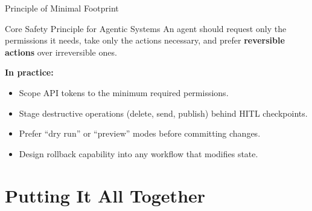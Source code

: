 \documentclass{beamer}       %
\begin{document}
\begin{frame}{Principle of Minimal Footprint}
    \begin{block}{Core Safety Principle for Agentic Systems}
        An agent should request only the permissions it needs, take only the actions necessary, and prefer \textbf{reversible actions} over irreversible ones.
    \end{block}
    \vspace{0.2cm}
    \textbf{In practice:}
    \begin{itemize}
        \item Scope API tokens to the minimum required permissions.
        \item Stage destructive operations (delete, send, publish) behind HITL checkpoints.
        \item Prefer ``dry run'' or ``preview'' modes before committing changes.
        \item Design rollback capability into any workflow that modifies state.
    \end{itemize}
\end{frame}


\section{Putting It All Together}
\end{document}
